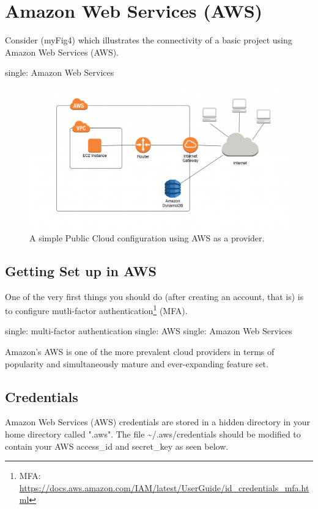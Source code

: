\section{Amazon Web Services (AWS)}

\justify
Consider ({myFig4}) which illustrates the connectivity of a basic
project using Amazon Web Services (AWS).

single: Amazon Web Services

\begin{figure}
\centering
\includegraphics[scale=0.45]{../images/ddb-no-vpc-endpoint-1024x561.png}
\caption{A simple Public Cloud configuration using AWS as a provider.}
\end{figure}

\subsection{Getting Set up in AWS}

\justify
One of the very first things you should do (after creating an account,
that is) is to configure mutli-factor authentication\footnote{MFA:
  \url{https://docs.aws.amazon.com/IAM/latest/UserGuide/id_credentials_mfa.html}}
(MFA).

single: multi-factor authentication
single: AWS single: Amazon Web Services

\justify
Amazon's AWS is one of the more prevalent cloud providers in terms of
popularity and simultaneously mature and ever-expanding feature set.

\subsection{Credentials}

\justify
Amazon Web Services (AWS) credentials are stored in a hidden directory
in your home directory called ".aws". The file
\textasciitilde{}/.aws/credentials should be modified to contain your
AWS access\_id and secret\_key as seen below.


